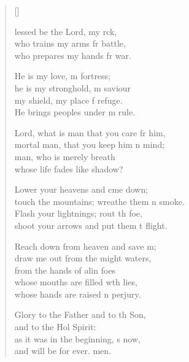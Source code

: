 \settowidth{\versewidth}{touch the mountains; wreathe them in smoke.}
\begin{verse}[\versewidth]
  \begin{patverse}
lessed be the Lord, my rck,\Flex\\
    who trains my arms fr battle,\Med\\
    who prepares my hands fr war.

He is my love, m fortress;\Med\\
    he is my stronghold, m saviour\\
my shield, my place f refuge.\Med\\
    He brings peoples under m rule.

Lord, what is man that you care fr him,\Med\\
    mortal man, that you keep him \pointup{\i}n mind;\\
man, who is merely  breath\Med\\
    whose life fades like  shadow?

Lower your heavens and cme down;\Med\\
    touch the mountains; wreathe them \pointup{\i}n smoke.\\
Flash your lightnings; rout th foe,\Med\\
    shoot your arrows and put them t flight.

Reach down from heaven and save m;\Flex\\
    draw me out from the might waters,\Med\\
    from the hands of alin foes\\
whose mouths are filled w\pointup{\i}th lies,\Med\\
    whose hands are raised \pointup{\i}n perjury.

Glory to the Father and to th Son,\Med\\
    and to the Hol Spirit:\\
as it was in the beginning, \pointup{\i}s now,\Med\\
    and will be for ever. men.
  \end{patverse}
\end{verse}
